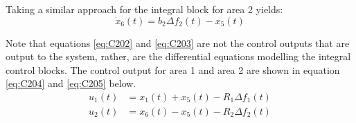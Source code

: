 Taking a similar approach for the integral block for area 2 yields:
\begin{equation}
	\dot{x}_6(t) = b_2 \Delta f_2(t) - x_5(t) \label{eq:C203}
\end{equation}

Note that equations \ref{eq:C202} and \ref{eq:C203} are not the control outputs that are output to the system, rather, are the differential equations modelling the integral control blocks. The control output for area 1 and area 2 are shown in equation \ref{eq:C204} and \ref{eq:C205} below.
\begin{align}
	u_1(t) &= x_1(t) + x_5(t) - R_1 \Delta f_1(t) \label{eq:C204} \\
	u_2(t) &= x_6(t) - x_5(t) - R_2 \Delta f_2(t) \label{eq:C205}
\end{align}